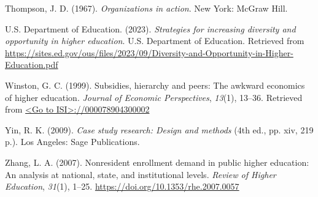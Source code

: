 \documentclass[
  12pt,
]{article}
\newlength{\cslhangindent}
\newlength{\cslentryspacingunit} %
\newenvironment{CSLReferences}[2] %
 {%
  \setlength{\parindent}{0pt}
  \ifodd #1
  \let\oldpar\par
  \def\par{\hangindent=\cslhangindent\oldpar}
  \fi
  \setlength{\parskip}{#2\cslentryspacingunit}
 }%
 {}
\begin{document}
\begin{CSLReferences}{1}{0}
\leavevmode{}%
Thompson, J. D. (1967). \emph{Organizations in action}. New York: McGraw Hill.

\leavevmode{}%
U.S. Department of Education. (2023). \emph{Strategies for increasing diversity and opportunity in higher education}. U.S. Department of Education. Retrieved from \url{https://sites.ed.gov/ous/files/2023/09/Diversity-and-Opportunity-in-Higher-Education.pdf}

\leavevmode{}%
Winston, G. C. (1999). Subsidies, hierarchy and peers: The awkward economics of higher education. \emph{Journal of Economic Perspectives}, \emph{13}(1), 13--36. Retrieved from \href{\%3CGo\%20to\%20ISI\%3E://000078904300002}{\textless Go to ISI\textgreater://000078904300002}

\leavevmode{}%
Yin, R. K. (2009). \emph{Case study research: Design and methods} (4th ed., pp. xiv, 219 p.). Los Angeles: Sage Publications.

\leavevmode{}%
Zhang, L. A. (2007). Nonresident enrollment demand in public higher education: An analysis at national, state, and institutional levels. \emph{Review of Higher Education}, \emph{31}(1), 1--25. \url{https://doi.org/10.1353/rhe.2007.0057}

\end{CSLReferences}
\end{document}
